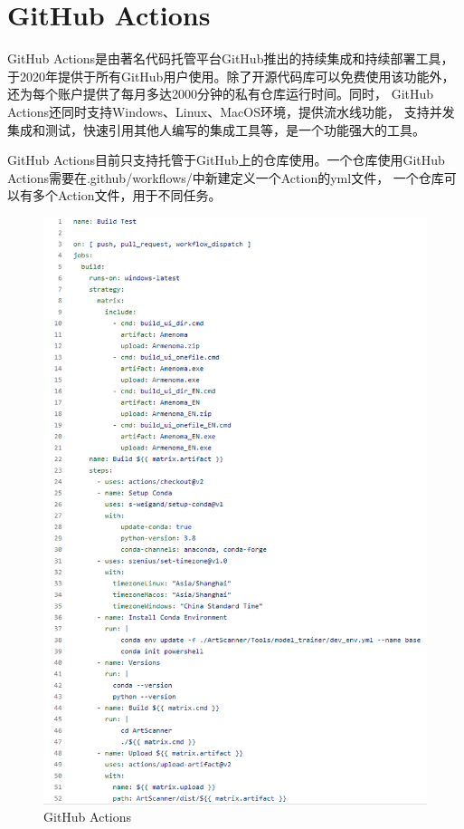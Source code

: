 \chapter{GitHub Actions}

GitHub Actions是由著名代码托管平台GitHub推出的持续集成和持续部署工具，
于2020年提供于所有GitHub用户使用。除了开源代码库可以免费使用该功能外，
还为每个账户提供了每月多达2000分钟的私有仓库运行时间。同时，
GitHub Actions还同时支持Windows、Linux、MacOS环境，提供流水线功能，
支持并发集成和测试，快速引用其他人编写的集成工具等，是一个功能强大的工具。

GitHub Actions目前只支持托管于GitHub上的仓库使用。一个仓库使用GitHub
Actions需要在.github/workflows/中新建定义一个Action的yml文件，
一个仓库可以有多个Action文件，用于不同任务。

\begin{figure}
    \centering
    \includegraphics[width=1\textwidth]{figures/github/actions.png}
    \caption{GitHub Actions}
    \label{fig:githubactions}
\end{figure}

